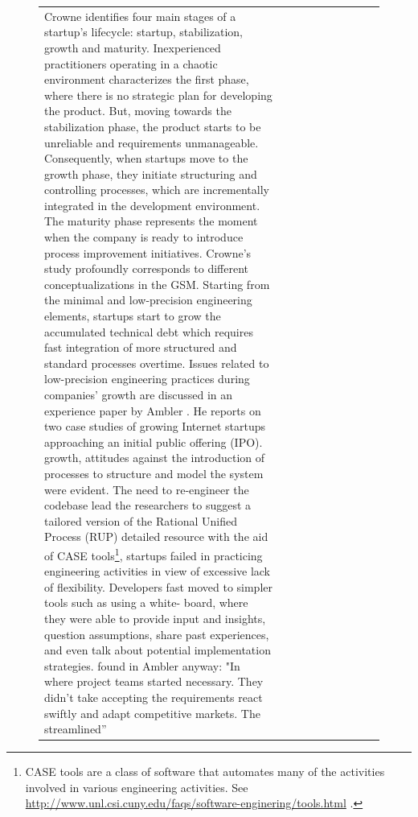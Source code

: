 \documentclass[12pt,journal,compsoc]{../sty/IEEEtran}
\begin{document}
\begin{table}[!t]
\begin{figure}[!t]
\begin{compactitem}
\begin{table}[!t]
\begin{tabular}{|l||c||c||c||c||c||c||c||c||c|}
Crowne \cite{Crowne2002} identifies four main stages of a startup's lifecycle:
startup, stabilization, growth and maturity. Inexperienced practitioners
operating in a chaotic environment characterizes the first phase, where there is
no strategic plan for developing the product. But, moving towards the
stabilization phase, the product starts to be unreliable and requirements
unmanageable. Consequently, when startups move to the growth phase, they
initiate structuring and controlling processes, which are incrementally
integrated in the development environment. The maturity phase represents the
moment when the company is ready to introduce process improvement initiatives.
Crowne's study profoundly corresponds to different conceptualizations in the
GSM. Starting from the minimal and low-precision engineering elements, startups
start to grow the accumulated technical debt which requires fast integration of
more structured and standard processes overtime. Issues related to low-precision
engineering practices during companies' growth  are discussed in an experience
paper by Ambler \cite{Ambler2002}. He reports on  two case studies of growing
Internet startups approaching an initial public   offering (IPO). %
growth, attitudes  against the introduction of processes to structure and model
the system were  evident. The need to re-engineer the codebase lead the
researchers to suggest a  tailored version of the Rational Unified Process (RUP)
detailed  %
resource  %
with the aid of CASE  tools\footnote{CASE tools are a class of software that
automates many of the  activities involved in various engineering activities.
See  \url{http://www.unl.csi.cuny.edu/faqs/software-enginering/tools.html} .},
startups failed in practicing engineering activities in view of excessive lack
of  flexibility. Developers fast moved to simpler tools such as using a white-
board,  where they were able to provide input and insights, question
assumptions, share  past experiences, and even talk about potential
implementation strategies.  %
found in Ambler anyway: "In  %
where project teams started  %
necessary. They didn't take  %
accepting the requirements  %
react swiftly and adapt  %
competitive markets. The  %
streamlined''}, that is modeling  %
coding, avoiding analysis  %


\end{tabular}
\end{table}
\end{compactitem}
\end{figure}
\end{table}
\end{document}

